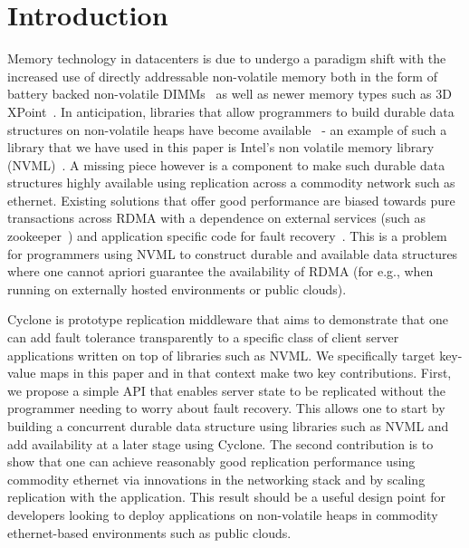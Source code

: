 \documentclass[letterpaper,twocolumn,10pt]{article}
\begin{document}
\section{Introduction}
Memory technology in datacenters is due to undergo a paradigm shift with the
increased use of directly addressable non-volatile memory both in the form of
battery backed non-volatile DIMMs~\cite{farm} as well as newer memory types
such as 3D XPoint~\cite{pmfs, bpfs}. In anticipation, libraries that allow
programmers to build durable data structures on non-volatile heaps have become
available~\cite{mnemosyne, nvheaps, cdds}  - an example of such a
library that we have used in this paper is Intel's non volatile memory library
(NVML)~\cite{nvml}. A missing piece however is a component to make such durable 
data structures highly available using replication across a commodity network
such as ethernet. Existing solutions that offer good performance are biased
towards pure transactions across RDMA with a dependence on external services
(such as zookeeper~\cite{zookeeper}) and application specific code for
fault recovery~\cite{farm, htm}.
This is a problem for programmers using NVML to construct durable and available 
data structures where one cannot apriori guarantee the availability of
RDMA (for e.g., when running on externally hosted environments or public
clouds).

Cyclone is prototype replication middleware that aims to demonstrate that one
can add fault tolerance transparently to a specific class of client server
applications written on top of libraries such as NVML. We specifically target
key-value maps in this paper and in that context make two key
contributions. First, we propose a simple API that enables server state to be
replicated without the programmer needing to worry about fault recovery. This
allows one to start by building a concurrent durable data structure using
libraries such as NVML and add availability at a later stage using Cyclone. The
second contribution is to show that one can achieve reasonably good replication 
performance using commodity ethernet via innovations in the networking stack and
by scaling replication with the application. This result should be a useful
design point for developers looking to deploy applications on non-volatile heaps
in commodity ethernet-based environments such as public clouds.
\end{document}
